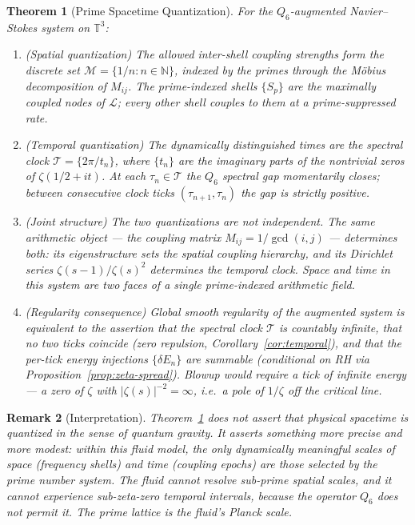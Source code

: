 \documentclass[11pt]{article}
\newtheorem{theorem}{Theorem}[section]
\newtheorem{remark}[theorem]{Remark}
\begin{document}
\begin{theorem}[Prime Spacetime Quantization]\label{thm:quantized-st}
For the $Q_6$-augmented Navier--Stokes system on $\mathbb{T}^3$:
\begin{enumerate}
\item \textup{(Spatial quantization)} The allowed inter-shell coupling
  strengths form the discrete set $\mathcal{M} = \{1/n : n \in \mathbb{N}\}$,
  indexed by the primes through the M\"obius decomposition of $M_{ij}$.
  The prime-indexed shells $\{S_p\}$ are the maximally coupled nodes of
  $\mathcal{L}$; every other shell couples to them at a prime-suppressed rate.

\item \textup{(Temporal quantization)} The dynamically distinguished times
  are the spectral clock $\mathcal{T} = \{2\pi/t_n\}$, where $\{t_n\}$ are
  the imaginary parts of the nontrivial zeros of $\zeta(1/2+it)$.
  At each $\tau_n \in \mathcal{T}$ the $Q_6$ spectral gap momentarily
  closes; between consecutive clock ticks $(\tau_{n+1}, \tau_n)$ the gap
  is strictly positive.

\item \textup{(Joint structure)} The two quantizations are not independent.
  The same arithmetic object --- the coupling matrix $M_{ij} = 1/\gcd(i,j)$
  --- determines both: its eigenstructure sets the spatial coupling
  hierarchy, and its Dirichlet series $\zeta(s-1)/\zeta(s)^2$ determines
  the temporal clock. \emph{Space and time in this system are two faces
  of a single prime-indexed arithmetic field.}

\item \textup{(Regularity consequence)} Global smooth regularity of the
  augmented system is equivalent to the assertion that the spectral clock
  $\mathcal{T}$ is countably infinite, that no two ticks coincide
  (zero repulsion, Corollary~\ref{cor:temporal}), and that the per-tick
  energy injections $\{\delta E_n\}$ are summable
  (conditional on RH via Proposition~\ref{prop:zeta-spread}).
  Blowup would require a tick of infinite energy --- a zero of $\zeta$
  with $|\zeta(s)|^{-2} = \infty$, i.e.\ a pole of $1/\zeta$
  off the critical line.
\end{enumerate}
\end{theorem}

\begin{remark}[Interpretation]
Theorem~\ref{thm:quantized-st} does not assert that physical spacetime
is quantized in the sense of quantum gravity. It asserts something more
precise and more modest: \emph{within this fluid model}, the only
dynamically meaningful scales of space (frequency shells) and time
(coupling epochs) are those selected by the prime number system.
The fluid cannot resolve sub-prime spatial scales, and it cannot
experience sub-zeta-zero temporal intervals, because the operator $Q_6$
does not permit it. The prime lattice is the fluid's Planck scale.
\end{remark}
\end{document}
